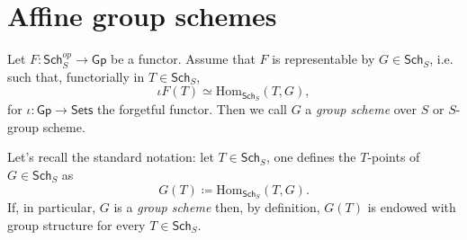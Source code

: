 \documentclass[../Main]{subfiles}
\begin{document}
\section{Affine group schemes}
\begin{defn}
	Let $F\colon \mathsf{Sch}_S^{op} \to \mathsf{Gp}$ be a functor.
	Assume that $F$ is representable by $G \in \mathsf{Sch}_{ S }$, i.e. such that, 
	functorially in $T \in \mathsf{Sch}_{ S }$,
	\begin{equation*}
		\iota F(T) \simeq \mathrm{Hom}_{\mathsf{Sch}_S} \left( T, G \right)
	,\end{equation*} 
	for $\iota\colon \mathsf{Gp} \to \mathsf{Sets}$ the forgetful functor.
	Then we call $G$ a {\em group scheme} over $S$
	or $S$-group scheme.
\end{defn}


\begin{rem}
	Let's recall the standard notation: let $T \in \mathsf{Sch}_{ S }$, one defines
	the $T$-points of $G \in \mathsf{Sch}_{ S }$ as
	\begin{equation*}
		G(T) \coloneqq \mathrm{Hom}_{\mathsf{Sch}_{ S }} \left( T, G \right)
	.\end{equation*} 
	If, in particular, $G$ is a {\em group scheme} then, by definition,
	$G(T)$ is endowed with group structure for every $T \in \mathsf{Sch}_{ S }$.
\end{rem}
\end{document}

